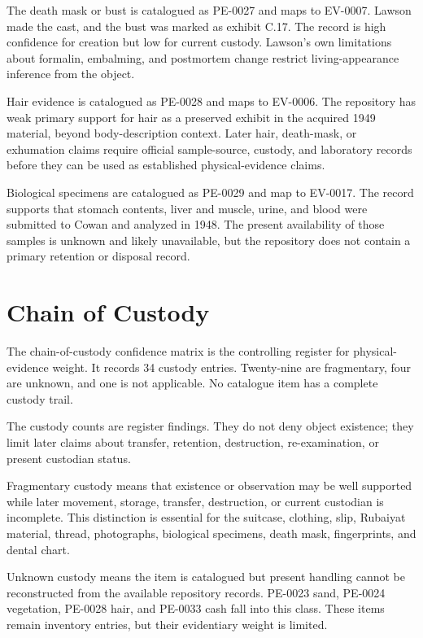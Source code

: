 The death mask or bust is catalogued as PE-0027 and maps to EV-0007. Lawson made the cast, and the bust was marked as exhibit C.17. The record is high confidence for creation but low for current custody. Lawson's own limitations about formalin, embalming, and postmortem change restrict living-appearance inference from the object.

Hair evidence is catalogued as PE-0028 and maps to EV-0006. The repository has weak primary support for hair as a preserved exhibit in the acquired 1949 material, beyond body-description context. Later hair, death-mask, or exhumation claims require official sample-source, custody, and laboratory records before they can be used as established physical-evidence claims.

Biological specimens are catalogued as PE-0029 and map to EV-0017. The record supports that stomach contents, liver and muscle, urine, and blood were submitted to Cowan and analyzed in 1948. The present availability of those samples is unknown and likely unavailable, but the repository does not contain a primary retention or disposal record.

\section{Chain of Custody}

The chain-of-custody confidence matrix is the controlling register for physical-evidence weight. It records 34 custody entries. Twenty-nine are fragmentary, four are unknown, and one is not applicable. No catalogue item has a complete custody trail.

The custody counts are register findings. They do not deny object existence; they limit later claims about transfer, retention, destruction, re-examination, or present custodian status.

Fragmentary custody means that existence or observation may be well supported while later movement, storage, transfer, destruction, or current custodian is incomplete. This distinction is essential for the suitcase, clothing, slip, Rubaiyat material, thread, photographs, biological specimens, death mask, fingerprints, and dental chart.

Unknown custody means the item is catalogued but present handling cannot be reconstructed from the available repository records. PE-0023 sand, PE-0024 vegetation, PE-0028 hair, and PE-0033 cash fall into this class. These items remain inventory entries, but their evidentiary weight is limited.

